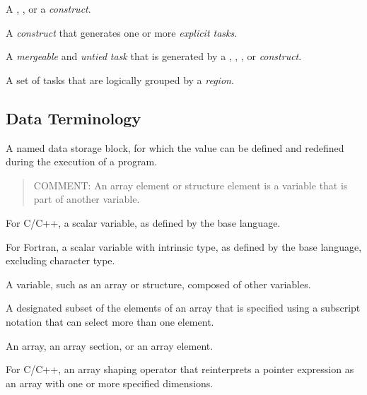 \glossarydefstart
A , , or a  \emph{construct}.
\glossarydefend
\bigskip

\glossarydefstart
A \emph{construct} that generates one or more \emph{explicit tasks}.
\glossarydefend
\bigskip

\glossarydefstart
A \emph{mergeable} and \emph{untied} \emph{task} that is generated by 
a , , , or 
 \emph{construct}.
\glossarydefend

\glossarydefstart
A set of tasks that are logically grouped by a  \emph{region}.
\glossarydefend


\subsection{Data Terminology}
\label{subsec:Data Terminology}
\glossarydefstart
A named data storage block, for which the value can be defined and 
redefined during the execution of a program.

\begin{quote}
COMMENT: An array element or structure element is a variable that is part of 
another variable.
\end{quote}
\glossarydefend

\glossarydefstart
For C/C++, a scalar variable, as defined by the base language.

For Fortran, a scalar variable with intrinsic type, as defined by 
the base language, excluding character type.
\glossarydefend

\glossarydefstart
A variable, such as an array or structure, composed of other variables.
\glossarydefend

\glossarydefstart
A designated subset of the elements of an array that is specified using a
subscript notation that can select more than one element.
\glossarydefend

\glossarydefstart
An array, an array section, or an array element.
\glossarydefend

\glossarydefstart
For C/C++, an array shaping operator that reinterprets a pointer expression as
an array with one or more specified dimensions.
\glossarydefend


